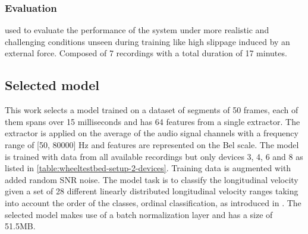 \subsubsection{Evaluation} \label{subsubsec:evaluatio-dataset}
used to evaluate the performance of the system under more realistic and
challenging conditions unseen during training like high slippage induced by an
external force. Composed of 7 recordings with a total duration of 17 minutes.

\subsection{Selected model} \label{subsec:selected-model} 

This work selects a model trained on a dataset of segments of 50 frames, each
of them spans over 15 milliseconds and has 64 features from a single
 extractor. The extractor is applied on
the average of the audio signal channels with a frequency range of [50, 80000]
Hz and features are represented on the Bel scale. The model is trained with
data from all available recordings but only devices 3, 4, 6 and 8 as listed in
\cref{table:wheeltestbed-setup-2-devices}. Training data is augmented with
added random SNR noise. The model task is to classify the longitudinal velocity
given a set of 28 different linearly distributed longitudinal velocity ranges
taking into account the order of the classes, ordinal classification, as
introduced in \cite{ordclass2006}. The selected model makes use of a batch
normalization layer and has a size of 51.5MB. 